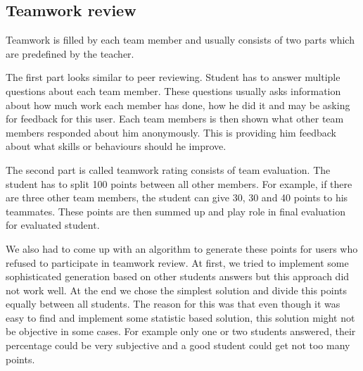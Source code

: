 
\subsection{Teamwork review}
\label{sec:teamreview}
Teamwork is filled by each team member and usually consists of two parts which are predefined by the teacher. 

The first part looks similar to peer reviewing. Student has to answer multiple questions about each team member. These questions usually asks information about how much work each member has done, how he did it and may be asking for feedback for this user. Each team members is then shown what other team members responded about him anonymously. This is providing him feedback about what skills or behaviours should he improve.


The second part is called teamwork rating consists of team evaluation. The student has to split 100 points between all other members. For example, if there are three other team members, the student can give 30, 30 and 40 points to his teammates. These points are then summed up and play role in final evaluation for evaluated student. 


We also had to come up with an algorithm to generate these points for users who refused to participate in teamwork review. At first, we tried to implement some sophisticated generation based on other students answers but this approach did not work well. At the end we chose the simplest solution and divide this points equally between all students. The reason for this was that even though it was easy to find and implement some statistic based solution, this solution might not be objective in some cases. For example only one or two students answered, their percentage could be very subjective and a good student could get not too many points.


